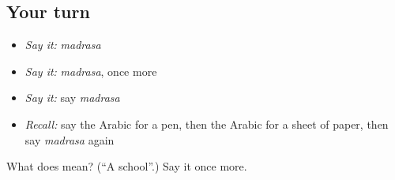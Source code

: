 \subsection*{Your turn}
\begin{itemize}
\raggedright
  \item \emph{Say it:} \emph{madrasa}
  \item \emph{Say it:} \emph{madrasa}, once more
  \item \emph{Say it:} say \emph{madrasa}
  \item \emph{Recall:} say the Arabic for a pen, then the Arabic for a sheet of paper, then say \emph{madrasa} again
\end{itemize}

\begin{tcolorbox}[breakable,colback=teal!4,colframe=teal!35!black,title={Before you move on}]
What does  mean? (\textquotedblleft{}A school\textquotedblright{}.) Say it once more.
\end{tcolorbox}
